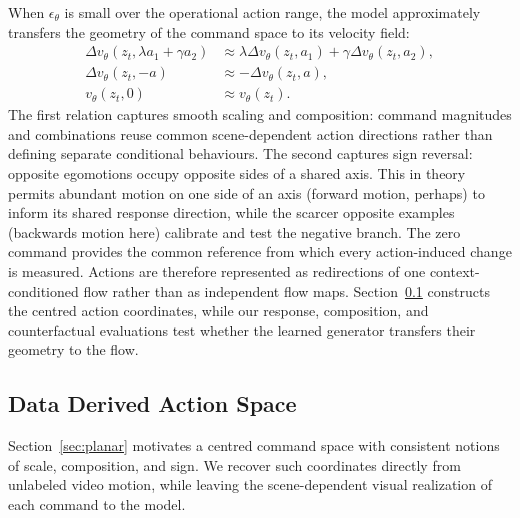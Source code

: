 \documentclass[letterpaper]{article} %
\begin{document}
When $\epsilon_\theta$ is small over the operational action range, the model
approximately transfers the geometry of the command space to its velocity
field:
\begin{equation}
    \begin{aligned}
        \Delta v_\theta(z_t,\lambda a_1+\gamma a_2)
        &\approx
        \lambda\Delta v_\theta(z_t,a_1)
        +
        \gamma\Delta v_\theta(z_t,a_2),\\
        \Delta v_\theta(z_t,-a)
        &\approx
        -\Delta v_\theta(z_t,a),\\
        v_\theta(z_t,0)
        &\approx
        v_\theta(z_t).
    \end{aligned}
    \label{eq:control_affine_predictions}
\end{equation}
The first relation captures smooth scaling and composition: command
magnitudes and combinations reuse common scene-dependent action directions
rather than defining separate conditional behaviours. The second captures
sign reversal: opposite egomotions occupy opposite sides of a shared axis.
This in theory permits abundant motion on one side of an axis (forward motion, perhaps) to inform its shared
response direction, while the scarcer opposite examples (backwards motion here) calibrate and test the negative branch. The
zero command provides the common reference from which every action-induced
change is measured. Actions are therefore represented as redirections of one
context-conditioned flow rather than as independent flow maps. Section~\ref{sec:pca}
constructs the centred action coordinates, while our response, composition,
and counterfactual evaluations test whether the learned generator transfers
their geometry to the flow.

\subsection{Data Derived Action Space}
\label{sec:pca}

Section~\ref{sec:planar} motivates a centred command space with consistent
notions of scale, composition, and sign. We recover such coordinates directly
from unlabeled video motion, while leaving the scene-dependent visual
realization of each command to the model.
\end{document}
